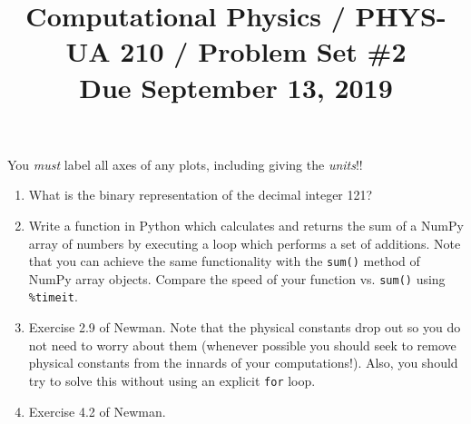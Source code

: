 \documentclass[11pt, preprint]{aastex}
\begin{document}
\title{\bf Computational Physics / PHYS-UA 210 / Problem Set \#2
\\ Due September 13, 2019 }

You {\it must} label all axes of any plots, including giving the {\it
  units}!!

\begin{enumerate}

  \item What is the binary representation of the decimal integer 121? 

  \item Write a function in Python which calculates and returns the
    sum of a NumPy array of numbers by executing a loop which performs
    a set of additions. Note that you can achieve the same
    functionality with the {\tt sum()} method of NumPy array
    objects. Compare the speed of your function vs. {\tt sum()} using
    {\tt \%timeit}. 

  \item Exercise 2.9 of Newman. Note that the physical constants drop
    out so you do not need to worry about them (whenever possible you
    should seek to remove physical constants from the innards of your
    computations!). Also, you should try to solve this without using
    an explicit {\tt for} loop.

  \item Exercise 4.2 of Newman.

\end{enumerate}
\end{document}
